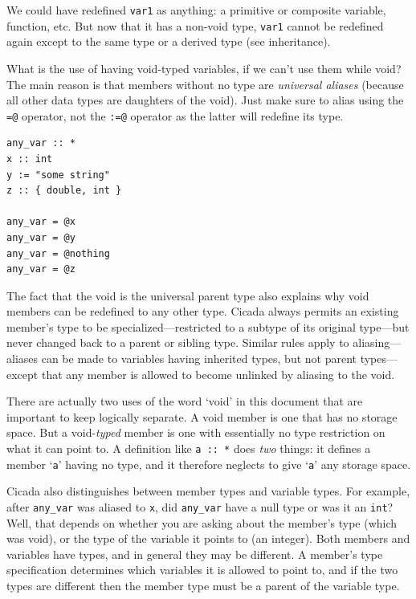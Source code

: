 \documentclass{article}
\newenvironment{code}{
       \begin{list}{}{
               \setlength{\leftmargin}{.4in}
               \setlength{\rightmargin}{0in}
               \setlength{\topsep}{.2in}
       }
       \small
       \item[] }
       { \end{list}   }
\begin{document}
\noindent We could have redefined \verb#var1# as anything:  a primitive or composite variable, function, etc.  But now that it has a non-void type, \verb#var1# cannot be redefined again except to the same type or a derived type (see inheritance).

What is the use of having void-typed variables, if we can't use them while void?  The main reason is that members without no type are \emph{universal aliases} (because all other data types are daughters of the void).  Just make sure to alias using the \verb#=@# operator, not the \verb#:=@# operator as the latter will redefine its type.

\begin{code} \begin{verbatim}
any_var :: *
x :: int
y := "some string"
z :: { double, int }

any_var = @x
any_var = @y
any_var = @nothing
any_var = @z
\end{verbatim} \end{code}

The fact that the void is the universal parent type also explains why void members can be redefined to any other type.  Cicada always permits an existing member's type to be specialized---restricted to a subtype of its original type---but never changed back to a parent or sibling type.  Similar rules apply to aliasing---aliases can be made to variables having inherited types, but not parent types---except that any member is allowed to become unlinked by aliasing to the void.

There are actually two uses of the word `void' in this document that are important to keep logically separate.  A void member is one that has no storage space.  But a void-\emph{typed} member is one with essentially no type restriction on what it can point to.  A definition like \verb#a :: *# does \emph{two} things:  it defines a member `\verb#a#' having no type, and it therefore neglects to give `\verb#a#' any storage space.

Cicada also distinguishes between member types and variable types.  For example, after \texttt{any\_var} was aliased to \texttt{x}, did \texttt{any\_var} have a null type or was it an \verb#int#?  Well, that depends on whether you are asking about the member's type (which was void), or the type of the variable it points to (an integer).  Both members and variables have types, and in general they may be different.  A member's type specification determines which variables it is allowed to point to, and if the two types are different then the member type must be a parent of the variable type.\\
\end{document}
